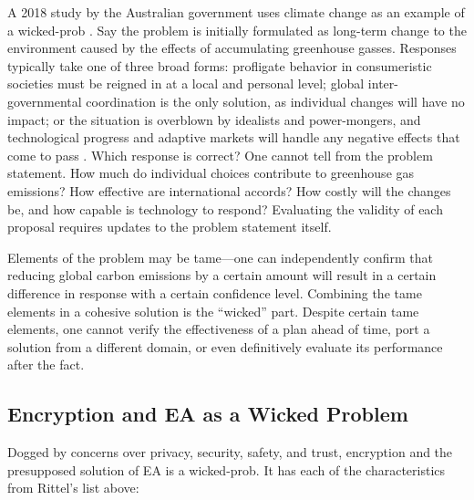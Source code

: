 A 2018 study by the Australian government uses climate change as an example of a \ac{wicked-prob}
\cite{commission_tackling_2018}. Say the problem is initially formulated as long-term change to the environment caused
by the effects of accumulating greenhouse gasses. Responses typically take one of three broad forms: profligate behavior
in consumeristic societies must be reigned in at a local and personal level; global inter-governmental coordination is
the only solution, as individual changes will have no impact; or the situation is overblown by idealists and
power-mongers, and technological progress and adaptive markets will handle any negative effects that come to pass
\cite{commission_tackling_2018}. Which response is correct? One cannot tell from the problem statement. How much do
individual choices contribute to greenhouse gas emissions? How effective are international accords? How costly will the
changes be, and how capable is technology to respond? Evaluating the validity of each proposal requires updates to the
problem statement itself.

Elements of the problem may be tame---one can independently confirm that reducing global carbon emissions by a certain
amount will result in a certain difference in response with a certain confidence level. Combining the tame elements in a
cohesive solution is the ``wicked'' part. Despite certain tame elements, one cannot verify the effectiveness of a plan
ahead of time, port a solution from a different domain, or even definitively evaluate its performance after the fact.

\subsection{Encryption and EA as a Wicked Problem}

Dogged by concerns over privacy, security, safety, and trust, \ac{encryption} and the presupposed solution of \ac{EA} is
a \ac{wicked-prob}. It has each of the characteristics from Rittel's list above:

